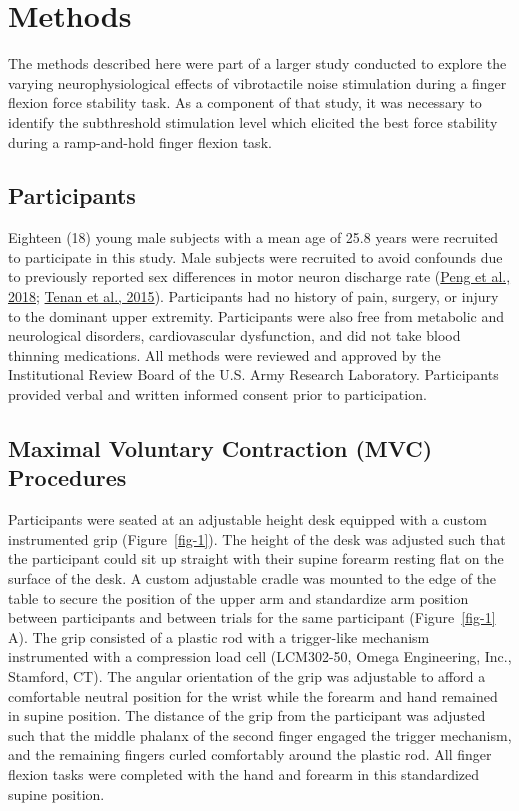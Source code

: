 \documentclass[]{cik}%
\begin{document}
\newpage

\hypertarget{methods}{%
\section{Methods}\label{methods}}

The methods described here were part of a larger study conducted to
explore the varying neurophysiological effects of vibrotactile noise
stimulation during a finger flexion force stability task. As a component
of that study, it was necessary to identify the subthreshold stimulation
level which elicited the best force stability during a ramp-and-hold
finger flexion task.

\hypertarget{participants}{%
\subsection{Participants}\label{participants}}

Eighteen (18) young male subjects with a mean age of 25.8 years
were recruited to participate in this study. Male subjects were
recruited to avoid confounds due to previously reported sex differences
in motor neuron discharge rate (\protect\hyperlink{ref-Peng2018}{Peng et
al., 2018}; \protect\hyperlink{ref-Tenan2016}{Tenan et al., 2015}).
Participants had no history of pain, surgery, or injury to the dominant
upper extremity. Participants were also free from metabolic and
neurological disorders, cardiovascular dysfunction, and did not take
blood thinning medications. All methods were reviewed and approved by
the Institutional Review Board of the U.S. Army Research Laboratory.
Participants provided verbal and written informed consent prior to
participation.

\hypertarget{maximal-voluntary-contraction-mvc-procedures}{%
\subsection{Maximal Voluntary Contraction (MVC)
Procedures}\label{maximal-voluntary-contraction-mvc-procedures}}

Participants were seated at an adjustable height desk equipped with a
custom instrumented grip (Figure~\ref{fig-1}). The height of the desk
was adjusted such that the participant could sit up straight with their
supine forearm resting flat on the surface of the desk. A custom
adjustable cradle was mounted to the edge of the table to secure the
position of the upper arm and standardize arm position between
participants and between trials for the same participant
(Figure~\ref{fig-1} A). The grip consisted of a plastic rod with a
trigger-like mechanism instrumented with a compression load cell
(LCM302-50, Omega Engineering, Inc., Stamford, CT). The angular
orientation of the grip was adjustable to afford a comfortable neutral
position for the wrist while the forearm and hand remained in supine
position. The distance of the grip from the participant was adjusted
such that the middle phalanx of the second finger engaged the trigger
mechanism, and the remaining fingers curled comfortably around the
plastic rod. All finger flexion tasks were completed with the hand and
forearm in this standardized supine position.
\end{document}
